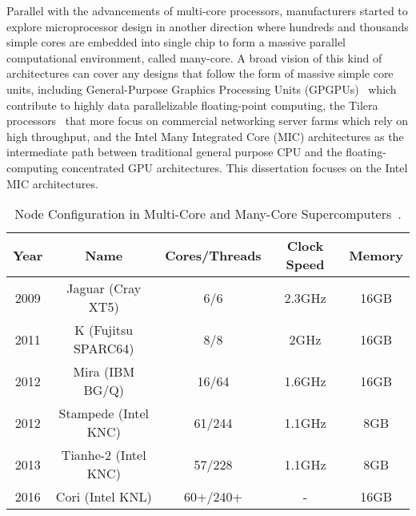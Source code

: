 Parallel with the advancements of multi-core processors, manufacturers
started to explore microprocessor design in another direction where hundreds
and thousands simple cores are embedded into single chip to form a massive
parallel computational environment, called many-core. A broad vision of
this kind of architectures can cover any designs that follow the form of
massive simple core units, including General-Purpose Graphics Processing
Units (GPGPUs)~\cite{gpu} which contribute to highly data parallelizable
floating-point computing, the Tilera processors~\cite{tilera} that more
focus on commercial networking server farms which rely on high throughput,
and the Intel Many Integrated Core (MIC) architectures as the intermediate
path between traditional general purpose CPU and the floating-computing
concentrated GPU architectures. This dissertation focuses on the Intel MIC
architectures.


\begin{table}[ht]%
\begin{center}
\caption{Node Configuration in Multi-Core and Many-Core Supercomputers~\cite{top500}.}
\label{tab:intro-machines}
\vspace{1.5ex}
\begin{tabular}{c|c|c|c|c}
\hline
\hline
Year & Name & Cores/Threads & Clock Speed & Memory \\
\hline
2009 & Jaguar (Cray XT5) & 6/6 & 2.3GHz & 16GB\\
2011 & K (Fujitsu SPARC64) & 8/8 & 2GHz & 16GB \\
2012 & Mira (IBM BG\slash Q) & 16/64 & 1.6GHz & 16GB \\
2012 & Stampede (Intel KNC) & 61/244 & 1.1GHz & 8GB \\
2013 & Tianhe-2 (Intel KNC) & 57/228 & 1.1GHz & 8GB \\
2016 & Cori (Intel KNL) & 60+/240+ & - & 16GB \\
\hline
\hline
\end{tabular}
\end{center}
\end{table}

